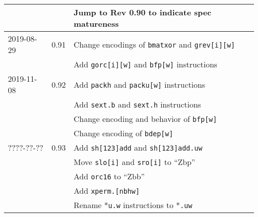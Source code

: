 \documentclass[twoside,11pt]{book}
\begin{document}
\begin{center}
\begin{tabular}{lll}
           &      & Jump to Rev 0.90 to indicate spec matureness \\
\hline
2019-08-29 & 0.91 & Change encodings of {\tt bmatxor} and {\tt grev[i][w]} \\
	   &      & Add {\tt gorc[i][w]} and {\tt bfp[w]} instructions \\
\hline
2019-11-08 & 0.92 & Add {\tt packh} and {\tt packu[w]} instructions \\
	   &      & Add {\tt sext.b} and {\tt sext.h} instructions \\
	   &      & Change encoding and behavior of {\tt bfp[w]} \\
	   &      & Change encoding of {\tt bdep[w]} \\
\hline
????-??-?? & 0.93 & Add {\tt sh[123]add} and {\tt sh[123]add.uw} \\
	   &      & Move {\tt slo[i]} and {\tt sro[i]} to ``Zbp'' \\
	   &      & Add {\tt orc16} to ``Zbb'' \\
	   &      & Add {\tt xperm.[nbhw]} \\
	   &      & Rename *{\tt u.w} instructions to *{\tt .uw} \\
\hline
\end{tabular}
\end{center}



\end{document}
